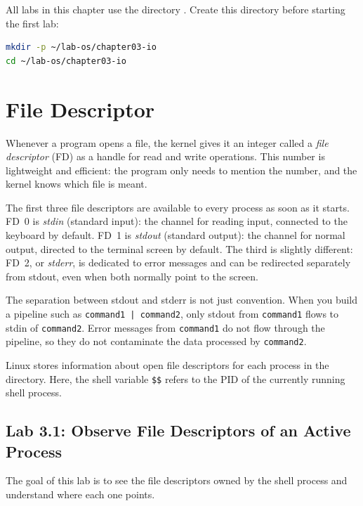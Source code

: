 \begin{notebox}
All labs in this chapter use the directory .
Create this directory before starting the first lab:
\begin{lstlisting}[language=bash]
mkdir -p ~/lab-os/chapter03-io
cd ~/lab-os/chapter03-io
\end{lstlisting}
\end{notebox}

\section{File Descriptor}
\label{sec:file-descriptors}

Whenever a program opens a file, the kernel gives it an integer called a \textit{file descriptor} (FD) as a handle for read and write operations. This number is lightweight and efficient: the program only needs to mention the number, and the kernel knows which file is meant.

The first three file descriptors are available to every process as soon as it starts. FD~0 is \textit{stdin} (standard input): the channel for reading input, connected to the keyboard by default. FD~1 is \textit{stdout} (standard output): the channel for normal output, directed to the terminal screen by default. The third is slightly different: FD~2, or \textit{stderr}, is dedicated to error messages and can be redirected separately from stdout, even when both normally point to the screen.

The separation between stdout and stderr is not just convention. When you build a pipeline such as \texttt{command1 | command2}, only stdout from \texttt{command1} flows to stdin of \texttt{command2}. Error messages from \texttt{command1} do not flow through the pipeline, so they do not contaminate the data processed by \texttt{command2}.

Linux stores information about open file descriptors for each process in the  directory. Here, the shell variable \texttt{\$\$} refers to the PID of the currently running shell process.

\subsection*{Lab 3.1: Observe File Descriptors of an Active Process}

The goal of this lab is to see the file descriptors owned by the shell process and understand where each one points.


